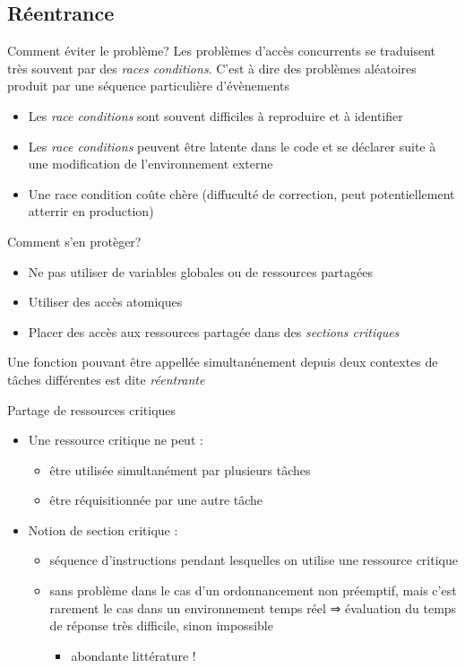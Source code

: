 \subsection{Réentrance}

\begin{frame}{Comment éviter le problème?}
  Les problèmes  d'accès concurrents se  traduisent très souvent  par des
  \emph{races  conditions}.  C'est  à  dire des  problèmes  aléatoires
  produit par une séquence particulière d'évènements
  \begin{itemize} 
  \item   Les  \emph{race  conditions}   sont  souvent   difficiles  à
    reproduire et à identifier
  \item Les  \emph{race conditions} peuvent être latente  dans le code
    et se déclarer suite à une modification de l'environnement externe
  \item Une race condition coûte chère (diffuculté de correction, peut
    potentiellement atterrir en production)
  \end{itemize} 
  Comment s'en protèger?
  \begin{itemize} 
  \item Ne pas utiliser de variables globales ou de ressources partagées
  \item Utiliser des accès atomiques
  \item  Placer des  accès aux  ressources partagée  dans  des \emph{sections
    critiques}
  \end{itemize} 
  Une  fonction  pouvant  être  appellée simultanénement  depuis  deux
  contextes de tâches différentes est dite \emph{réentrante}
\end{frame} 

\begin{frame}{Partage de ressources critiques} 
  \begin{itemize}
  \item Une ressource critique ne peut :
    \begin{itemize}
    \item être utilisée simultanément par plusieurs tâches 
    \item être réquisitionnée par une autre tâche 
    \end{itemize}
  \item Notion de section critique :
    \begin{itemize}
    \item  séquence d'instructions pendant  lesquelles on  utilise une
      ressource critique
    \item sans problème dans le cas d'un ordonnancement non préemptif,
      mais c'est  rarement le cas  dans un environnement temps  réel ⇒
      évaluation du temps de réponse très difficile, sinon impossible
      \begin{itemize}
      \item abondante littérature ! 
      \end{itemize}
    \end{itemize}
  \end{itemize}
\end{frame}

